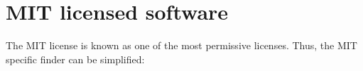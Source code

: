 %
%
%
%
%



\section{MIT licensed software}

The MIT license is known as one of the most permissive licenses. Thus, the
MIT specific finder can be simplified:

